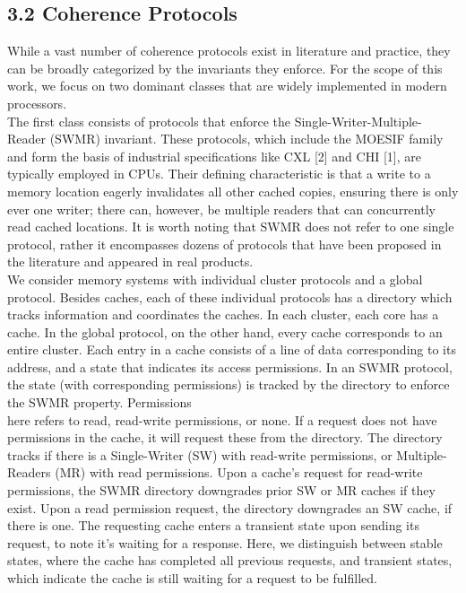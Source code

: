 \documentclass[10pt]{article}
\begin{document}
\subsection*{3.2 Coherence Protocols}
While a vast number of coherence protocols exist in literature and practice, they can be broadly categorized by the invariants they enforce. For the scope of this work, we focus on two dominant classes that are widely implemented in modern processors.\\[0pt]
The first class consists of protocols that enforce the Single-Writer-Multiple-Reader (SWMR) invariant. These protocols, which include the MOESIF family and form the basis of industrial specifications like CXL [2] and CHI [1], are typically employed in CPUs. Their defining characteristic is that a write to a memory location eagerly invalidates all other cached copies, ensuring there is only ever one writer; there can, however, be multiple readers that can concurrently read cached locations. It is worth noting that SWMR does not refer to one single protocol, rather it encompasses dozens of protocols that have been proposed in the literature and appeared in real products.\\
We consider memory systems with individual cluster protocols and a global protocol. Besides caches, each of these individual protocols has a directory which tracks information and coordinates the caches. In each cluster, each core has a cache. In the global protocol, on the other hand, every cache corresponds to an entire cluster. Each entry in a cache consists of a line of data corresponding to its address, and a state that indicates its access permissions. In an SWMR protocol, the state (with corresponding permissions) is tracked by the directory to enforce the SWMR property. Permissions\\
here refers to read, read-write permissions, or none. If a request does not have permissions in the cache, it will request these from the directory. The directory tracks if there is a Single-Writer (SW) with read-write permissions, or Multiple-Readers (MR) with read permissions. Upon a cache's request for read-write permissions, the SWMR directory downgrades prior SW or MR caches if they exist. Upon a read permission request, the directory downgrades an SW cache, if there is one. The requesting cache enters a transient state upon sending its request, to note it's waiting for a response. Here, we distinguish between stable states, where the cache has completed all previous requests, and transient states, which indicate the cache is still waiting for a request to be fulfilled.
\end{document}
